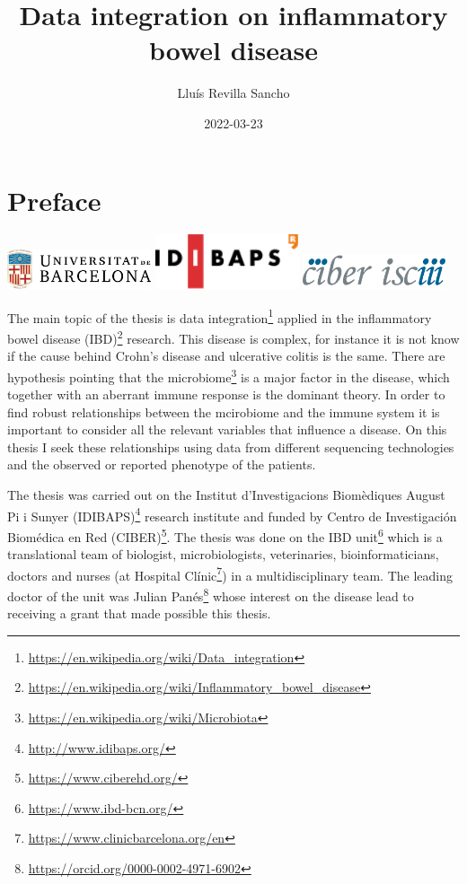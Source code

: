 \documentclass[
  a4paper,
]{book}
\title{Data integration on inflammatory bowel disease}
\author{Lluís Revilla Sancho}
\date{2022-03-23}
\DeclareRobustCommand{\href}[2]{#2\footnote{\url{#1}}}
\begin{document}
\maketitle

{
\hypersetup{linkcolor=}
\setcounter{tocdepth}{2}
\tableofcontents
}
\listoffigures
\listoftables
\hypertarget{preface}{%
\chapter*{Preface}\label{preface}}

\includegraphics[width=1.66667in,height=\textheight]{images/ub_logo.png} \includegraphics[width=1.66667in,height=\textheight]{images/idibaps_logo.png} \includegraphics[width=1.66667in,height=0.39583in]{images/logo_ciber.png}

The main topic of the thesis is \href{https://en.wikipedia.org/wiki/Data_integration}{data integration} applied in the \href{https://en.wikipedia.org/wiki/Inflammatory_bowel_disease}{inflammatory bowel disease (IBD)} research.
This disease is complex, for instance it is not know if the cause behind Crohn's disease and ulcerative colitis is the same.
There are hypothesis pointing that the \href{https://en.wikipedia.org/wiki/Microbiota}{microbiome} is a major factor in the disease, which together with an aberrant immune response is the dominant theory.
In order to find robust relationships between the mcirobiome and the immune system it is important to consider all the relevant variables that influence a disease.
On this thesis I seek these relationships using data from different sequencing technologies and the observed or reported phenotype of the patients.

The thesis was carried out on the \href{http://www.idibaps.org/}{Institut d'Investigacions Biomèdiques August Pi i Sunyer (IDIBAPS)} research institute and funded by \href{https://www.ciberehd.org/}{Centro de Investigación Biomédica en Red (CIBER)}.
The thesis was done on \href{https://www.ibd-bcn.org/}{the IBD unit} which is a translational team of biologist, microbiologists, veterinaries, bioinformaticians, doctors and nurses (at \href{https://www.clinicbarcelona.org/en}{Hospital Clínic}) in a multidisciplinary team.
The leading doctor of the unit was \href{https://orcid.org/0000-0002-4971-6902}{Julian Panés} whose interest on the disease lead to receiving a grant that made possible this thesis.
\end{document}
